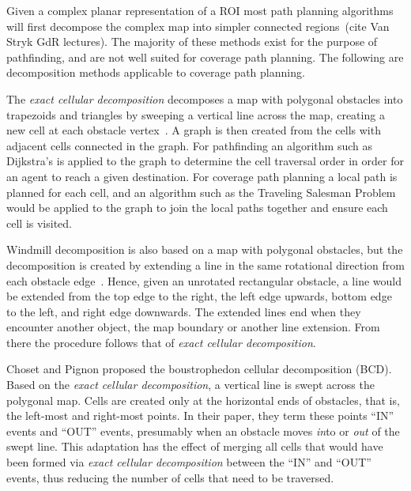 Given a complex planar representation of a ROI most path planning algorithms will first decompose the complex map into simpler connected regions~\cite{Cell_decomposition_survey}(cite Van Stryk GdR lectures).
The majority of these methods exist for the purpose of pathfinding, and are not well suited for coverage path planning.
The following are decomposition methods applicable to coverage path planning.

The \textit{exact cellular decomposition} decomposes a map with polygonal obstacles into trapezoids and triangles by sweeping a vertical line across the map, creating a new cell at each obstacle vertex~\cite{Robot_motion_planning}.
A graph is then created from the cells with adjacent cells connected in the graph.
For pathfinding an algorithm such as Dijkstra's is applied to the graph to determine the cell traversal order in order for an agent to reach a given destination.
For coverage path planning a local path is planned for each cell, and an algorithm such as the Traveling Salesman Problem would be applied to the graph to join the local paths together and ensure each cell is visited.

Windmill decomposition is also based on a map with polygonal obstacles, but the decomposition is created by extending a line in the same rotational direction from each obstacle edge~\cite{Windmill_decomp_for_free_pp}.
Hence, given an unrotated rectangular obstacle, a line would be extended from the top edge to the right, the left edge upwards, bottom edge to the left, and right edge downwards.
The extended lines end when they encounter another object, the map boundary or another line extension.
From there the procedure follows that of \textit{exact cellular decomposition}.

Choset and Pignon proposed the boustrophedon cellular decomposition (BCD)\cite{Bous_cellular_decomp}.
Based on the \textit{exact cellular decomposition}, a vertical line is swept across the polygonal map.
Cells are created only at the horizontal ends of obstacles, that is, the left-most and right-most points.
In their paper, they term these points ``IN'' events and ``OUT'' events, presumably when an obstacle moves \textit{in}to or \textit{out} of the swept line.
This adaptation has the effect of merging all cells that would have been formed via \textit{exact cellular decomposition} between the ``IN'' and ``OUT'' events, thus reducing the number of cells that need to be traversed.

